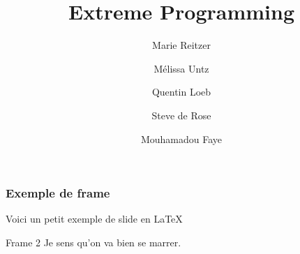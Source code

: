 \documentclass{beamer}
\title{Extreme Programming}
\author{Marie Reitzer \and Mélissa Untz \and Quentin Loeb \and Steve de Rose \and Mouhamadou Faye}
\date{}
\begin{document}
	\maketitle
	
	\begin{frame}
		\frametitle{Exemple de frame}
		Voici un petit exemple de slide en LaTeX
	\end{frame}

	\begin{frame}{Frame 2}
		Je sens qu'on va bien se marrer.
	\end{frame}
	
\end{document}
